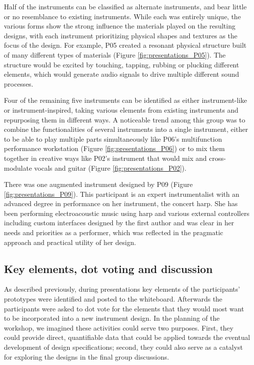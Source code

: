 \documentclass[letterpaper, 12pt]{article}
\begin{document}
Half of the instruments can be classified as alternate instruments, and bear little or no resemblance to existing instruments. While each was entirely unique, the various forms show the strong influence the materials played on the resulting designs, with each instrument prioritizing physical shapes and textures as the focus of the design. For example, P05 created a resonant physical structure built of many different types of materials (Figure \ref{fig:presentations_P05}). The structure would be excited by touching, tapping, rubbing or plucking different elements, which would generate audio signals to drive multiple different sound processes.

Four of the remaining five instruments can be identified as either instrument-like or instrument-inspired, taking various elements from existing instruments and repurposing them in different ways. A noticeable trend among this group was to combine the functionalities of several instruments into a single instrument, either to be able to play multiple parts simultaneously like P06's multifunction performance workstation (Figure \ref{fig:presentations_P06}) or to mix them together in creative ways like P02's instrument that would mix and cross-modulate vocals and guitar (Figure \ref{fig:presentations_P02}). 

There was one augmented instrument designed by P09 (Figure \ref{fig:presentations_P09}). This participant is an expert instrumentalist with an advanced degree in performance on her instrument, the concert harp. She has been performing electroacoustic music using harp and various external controllers including custom interfaces designed by the first author 
\citep{Sullivan2018}
and was clear in her needs and priorities as a performer, which was reflected in the pragmatic approach and practical utility of her design. 

\subsection{Key elements, dot voting and discussion}

As described previously, during presentations key elements of the participants' prototypes were identified and posted to the whiteboard. Afterwards the participants were asked to dot vote for the elements that they would most want to be incorporated into a new instrument design. In the planning of the workshop, we imagined these activities could serve two purposes. First, they could provide direct, quantifiable data that could be applied towards the eventual development of design specifications; second, they could also serve as a catalyst for exploring the designs in the final group discussions.
\end{document}
